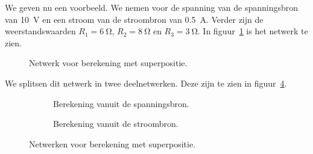 \begin{example}
We geven nu een voorbeeld. We nemen voor de spanning van de spanningsbron
van \SI{10}{\volt} en een stroom van de stroombron van \SI{0.5}{\ampere}. Verder zijn de weerstandswaarden
$R_1 = \SI{6}{\ohm}$, $R_2 = \SI{8}{\ohm}$ en $R_3 = \SI{3}{\ohm}$. In
figuur~\ref{fig:gelnetwerkvoorsuperpositiebeginsel2} is het netwerk te zien.

\begin{figure}[H]
\centering
{}
\caption{Netwerk voor berekening met superpositie.}
\label{fig:gelnetwerkvoorsuperpositiebeginsel2}
\end{figure}

We splitsen dit netwerk in twee deelnetwerken. Deze zijn te zien in
figuur~\ref{fig:gelnetwerkvoorsuperpositiebeginselsplitab2}.

\begin{figure}[H]
\begin{subfigure}{0.48\textwidth}
\centering
{}
\caption{Berekening vanuit de spanningsbron.}
\label{fig:gelnetwerkvoorsuperpositiebeginselsplita2}
\end{subfigure}\hfill%
\begin{subfigure}{0.48\textwidth}
\centering
{}
\caption{Berekening vanuit de stroombron.}
\label{fig:gelnetwerkvoorsuperpositiebeginselsplitb2}
\end{subfigure}
\caption{Netwerken voor berekening met superpositie.}
\label{fig:gelnetwerkvoorsuperpositiebeginselsplitab2}
\end{figure}


\end{example}
